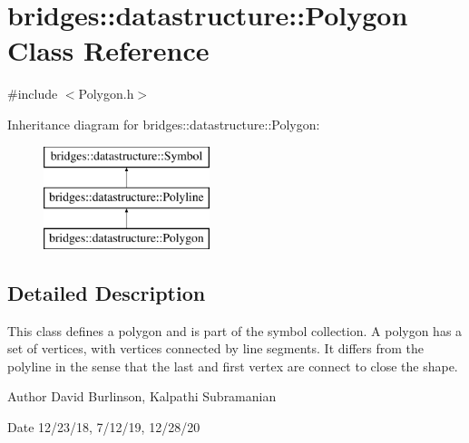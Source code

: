 \hypertarget{classbridges_1_1datastructure_1_1_polygon}{}\section{bridges\+:\+:datastructure\+:\+:Polygon Class Reference}
\label{classbridges_1_1datastructure_1_1_polygon}


{\ttfamily \#include $<$Polygon.\+h$>$}

Inheritance diagram for bridges\+:\+:datastructure\+:\+:Polygon\+:\begin{figure}[H]
\begin{center}
\leavevmode
\includegraphics[height=3.000000cm]{classbridges_1_1datastructure_1_1_polygon}
\end{center}
\end{figure}


\subsection{Detailed Description}
This class defines a polygon and is part of the symbol collection. A polygon has a set of vertices, with vertices connected by line segments. It differs from the polyline in the sense that the last and first vertex are connect to close the shape. 

\begin{DoxyAuthor}{Author}
David Burlinson, Kalpathi Subramanian 
\end{DoxyAuthor}
\begin{DoxyDate}{Date}
12/23/18, 7/12/19, 12/28/20 
\end{DoxyDate}
